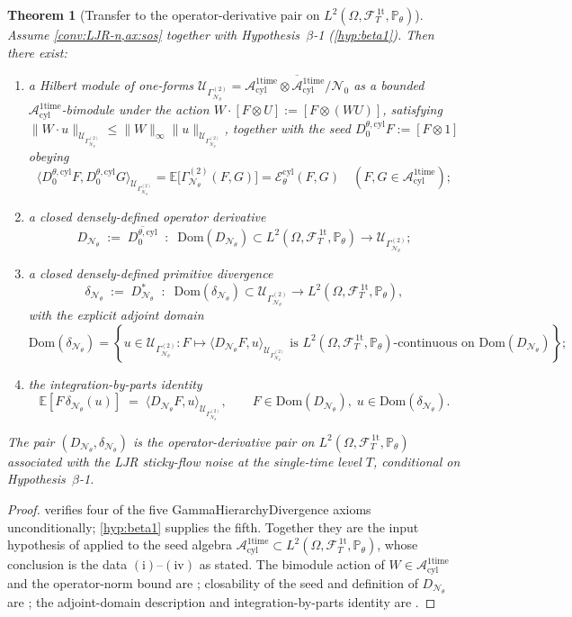 \documentclass[11pt,reqno]{amsart}
\theoremstyle{plain}
\newtheorem{theorem}{Theorem}[section]
\theoremstyle{definition}
\theoremstyle{remark}
\newcommand{\E}{\mathbb E}
\newcommand{\Prob}{\mathbb P}
\newcommand{\Dom}{\mathrm{Dom}}
\newcommand{\cA}{\mathcal A}
\newcommand{\cE}{\mathcal E}
\newcommand{\cF}{\mathcal F}
\newcommand{\cN}{\mathcal N}
\newcommand{\cU}{\mathcal U}
\newcommand{\Aone}{\cA_{\mathrm{cyl}}^{\mathrm{1time}}}
\newcommand{\FT}{\cF_{T}^{\,\mathrm{1t}}}
\newcommand{\Hone}{L^{2}(\Omega,\FT,\Pth)}
\newcommand{\GamN}{\Gamma^{(2)}_{\cN_{\theta}}}
\newcommand{\DN}{D_{\cN_{\theta}}}
\newcommand{\divN}{\delta_{\cN_{\theta}}}
\newcommand{\Ecyl}{\cE_{\theta}^{\mathrm{cyl}}}
\newcommand{\Pth}{\Prob_{\theta}}
\begin{document}
\begin{theorem}[Transfer to the operator-derivative pair on
$\Hone$]\label{thm:transfer-cyl}
Assume \cref{conv:LJR-n,ax:sos} together with Hypothesis~$\beta$-1
(\cref{hyp:beta1}). Then there exist:
\begin{enumerate}
\item[$(\mathrm i)$] a Hilbert module of one-forms
$\cU_{\GamN}=\overline{\Aone\otimes\Aone/\mathcal N_{0}}$ as a
bounded $\Aone$-bimodule under the action
$W\cdot[F\otimes U]:=[F\otimes(WU)]$, satisfying
$\|W\cdot u\|_{\cU_{\GamN}}\le\|W\|_{\infty}\|u\|_{\cU_{\GamN}}$,
together with the seed
$D_{0}^{\theta,\mathrm{cyl}}F:=[F\otimes 1]$ obeying
\[
  \langle D_{0}^{\theta,\mathrm{cyl}}F,D_{0}^{\theta,\mathrm{cyl}}G\rangle_{\cU_{\GamN}}
  =\E\bigl[\GamN(F,G)\bigr]
  =\Ecyl(F,G)
  \quad(F,G\in\Aone);
\]
\item[$(\mathrm{ii})$] a closed densely-defined operator derivative
\[
  \DN\;:=\;\overline{D_{0}^{\theta,\mathrm{cyl}}}\;\;\colon\;\;\Dom(\DN)\subset\Hone\longrightarrow\cU_{\GamN};
\]
\item[$(\mathrm{iii})$] a closed densely-defined primitive
divergence
\[
  \divN\;:=\;\DN^{*}\;\;\colon\;\;\Dom(\divN)\subset\cU_{\GamN}\longrightarrow\Hone,
\]
with the explicit adjoint domain
\[
  \Dom(\divN)
  =
  \left\{
  u\in\cU_{\GamN}:
  F\mapsto\langle\DN F,u\rangle_{\cU_{\GamN}}
  \text{ is }\Hone\text{-continuous on }\Dom(\DN)
  \right\};
\]
\item[$(\mathrm{iv})$] the integration-by-parts identity
\begin{equation}\label{eq:IBP-cyl}
  \E[F\,\divN(u)]
  \;=\;\langle\DN F,u\rangle_{\cU_{\GamN}},
  \qquad F\in\Dom(\DN),\;u\in\Dom(\divN).
\end{equation}
\end{enumerate}
The pair $(\DN,\divN)$ is the operator-derivative pair on $\Hone$
associated with the LJR sticky-flow noise at the single-time level
$T$, conditional on Hypothesis~$\beta$-1.
\end{theorem}

\begin{proof}
 verifies four of the five
GammaHierarchyDivergence axioms unconditionally;
\cref{hyp:beta1} supplies the fifth. Together they are the input
hypothesis of \cite[Thm.~A]{GammaHierarchyDivergence} applied to
the seed algebra $\Aone\subset\Hone$, whose conclusion is the data
$(\mathrm i)$--$(\mathrm{iv})$ as stated. The bimodule action of
$W\in\Aone$ and the operator-norm bound are
\cite[Thm.~A($\mathrm i$)]{GammaHierarchyDivergence}; closability of
the seed and definition of $\DN$ are
\cite[Thm.~B]{GammaHierarchyDivergence}; the adjoint-domain
description and integration-by-parts identity are
\cite[Thm.~B and Cor.~B.1]{GammaHierarchyDivergence}.
\end{proof}
\end{document}
